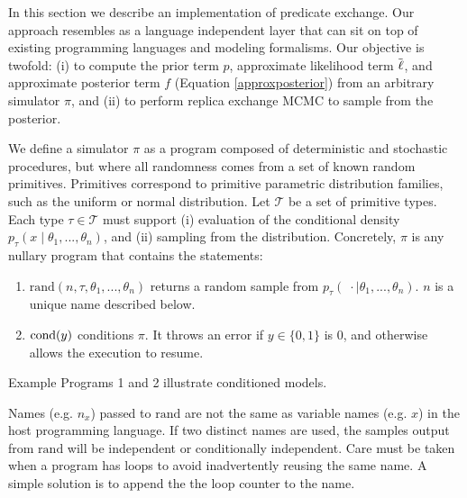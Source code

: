 

In this section we describe an implementation of predicate exchange.
Our approach resembles \citep{wingate2011lightweight, milch20071} as a language independent layer that can sit on top of existing programming languages and modeling formalisms.
Our objective is twofold: (i) to compute the prior term $p$, approximate likelihood term $\tilde{\operatorname{\ell}}$, and approximate posterior term $f$ (Equation \ref{approxposterior}) from an arbitrary simulator $\pi$, and (ii) to perform replica exchange MCMC to sample from the posterior.

We define a simulator $\pi$ as a program composed of deterministic and stochastic procedures, but where all randomness comes from a set of known random primitives.
Primitives correspond to primitive parametric distribution families, such as the uniform or normal distribution.
Let $\mathcal{T}$ be a set of primitive types.
Each type $\tau \in \mathcal{T}$ must support (i) evaluation of the conditional density $p_\tau(x \mid \theta_1, ..., \theta_n)$, and (ii) sampling from the distribution.
Concretely, $\pi$ is any nullary program that contains the statements:

\begin{enumerate}
  \item $\textrm{rand}(n, \tau, \theta_1, ...,\theta_n)$ returns a random sample from $p_\tau(\; \cdot \mid \theta_1, ..., \theta_n)$.  $n$ is a unique name described below.
  \item $\operatorname{cond}(y)$ conditions $\pi$.  It throws an error if $y \in \{0, 1\}$ is 0, and otherwise allows the execution to resume.
\end{enumerate}

Example Programs 1 and 2 illustrate conditioned models.

Names (e.g. $n_x$) passed to $\textrm{rand}$ are not the same as variable names (e.g. $x$) in the host programming language.
If two distinct names are used, the samples output from $\textrm{rand}$ will be independent or conditionally independent.
Care must be taken when a program has loops to avoid inadvertently reusing the same name.
A simple solution is to append the the loop counter to the name.



